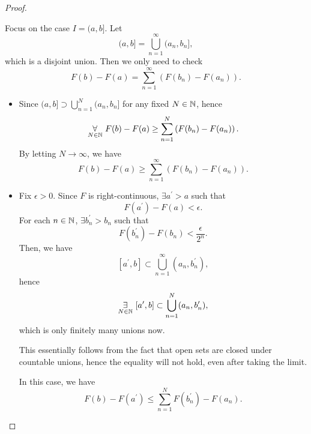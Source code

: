 \begin{proof}
\begin{enumerate}
		      Focus on the case \(I = (a, b]\). Let
		      \[
			      (a, b] = \bigcup\limits_{n=1}^{\infty} (a_{n}, b_{n}],
		      \]
		      which is a disjoint union. Then we only need to check
		      \[
			      F(b) - F(a) = \sum\limits_{n=1}^{\infty} \left(F(b_{n}) - F(a_{n})\right).
		      \]
		      \begin{itemize}
			      \item Since \((a, b]\supset \bigcup\limits_{n=1}^{N} (a_{n}, b_{n}]\) for any fixed \(N\in\mathbb{\MakeUppercase{N}} \), hence
			            \[
				            \underset{N\in\mathbb{\MakeUppercase{N}} }{\forall}\ F(b) - F(a) \geq \sum\limits_{n=1}^{N} \left(F(b_{n}) - F(a_{n})\right).
			            \]
			            By letting \(N \to \infty\), we have
			            \[
				            F(b) - F(a) \geq \sum\limits_{n=1}^{\infty} \left(F(b_{n}) - F(a_{n})\right).
			            \]
			      \item Fix \(\epsilon >0\). Since \(F\) is right-continuous, \(\exists a ^\prime > a\) such that
			            \[
				            F(a ^\prime ) - F(a) <\epsilon.
			            \]
			            For each \(n\in\mathbb{\MakeUppercase{N}} \), \(\exists b_{n} ^\prime > b_{n}\) such that
			            \[
				            F(b_{n} ^\prime ) - F(b_{n})<\frac{\epsilon }{2^n}.
			            \]
			            Then, we have
			            \[
				            [a ^\prime , b] \subset \bigcup\limits_{n=1}^{\infty} (a_{n}, b_{n} ^\prime ),
			            \]
			            hence
			            \[
				            \underset{ N\in\mathbb{\MakeUppercase{N}}}{\exists}\ [a ^\prime , b]\subset \bigcup\limits_{n=1}^{N} (a_{n}, b_{n} ^\prime ),
			            \]
			            which is only finitely many unions now.
			            \begin{remark}
				            This essentially follows from the fact that open sets are closed under countable unions, hence the equality will not hold, even after taking the limit.
			            \end{remark}

			            In this case, we have
			            \[
				            F(b) - F(a ^\prime ) \leq \sum\limits_{n=1}^{N} F(b_{n} ^\prime ) - F(a_{n}).
			            \]



\end{itemize}
\end{enumerate}
\end{proof}
